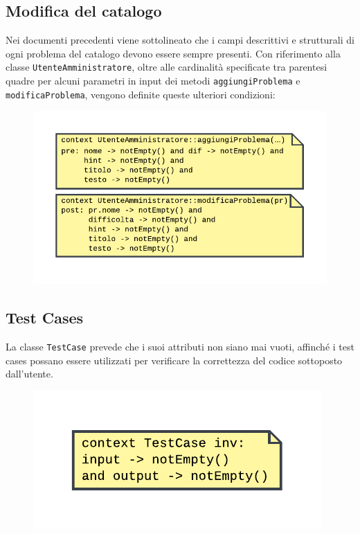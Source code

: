 \documentclass[11pt, a4paper]{article}
\theoremstyle{definition} %
\begin{document}
\subsection{Modifica del catalogo}
Nei documenti precedenti viene sottolineato che i campi descrittivi e
strutturali di ogni problema del catalogo devono essere sempre presenti.
Con riferimento alla classe \texttt{UtenteAmministratore}, oltre alle
cardinalità specificate tra parentesi quadre per alcuni parametri in input
dei metodi \texttt{aggiungiProblema} e \texttt{modificaProblema}, vengono
definite queste ulteriori condizioni:
\begin{figure}[H]
\centering
\includegraphics[scale = 0.8]{materiale/ocl-amministratore.pdf}
\end{figure}

\newpage
\subsection{Test Cases}
La classe \texttt{TestCase} prevede che i suoi attributi non siano mai
vuoti, affinché i test cases possano essere utilizzati per verificare
la correttezza del codice sottoposto dall'utente.

\begin{figure}[H]
\centering
\includegraphics[scale = 0.8]{materiale/ocl-testcase.pdf}
\end{figure}
\end{document}
